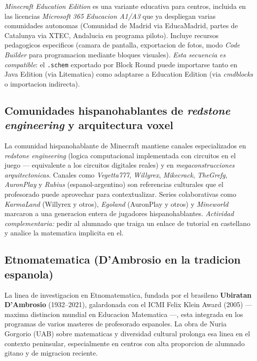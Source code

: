 \documentclass[12pt,a4paper]{scrartcl}
\newcommand{\acc}[1]{\textcolor{accent}{\textbf{#1}}}
\begin{document}
\emph{Minecraft Education Edition} es una variante educativa para centros, incluida en las licencias \emph{Microsoft 365 Educacion A1/A3} que ya despliegan varias comunidades autonomas (Comunidad de Madrid via EducaMadrid, partes de Catalunya via XTEC, Andalucia en programa piloto). Incluye recursos pedagogicos especificos (camara de pantalla, exportacion de fotos, modo \emph{Code Builder} para programacion mediante bloques visuales). \emph{Esta secuencia es compatible}: el \texttt{.schem} exportado por Block Round puede importarse tanto en Java Edition (via Litematica) como adaptarse a Education Edition (via \emph{cmdblocks} o importacion indirecta).

\subsection{Comunidades hispanohablantes de \emph{redstone engineering} y arquitectura voxel}

La comunidad hispanohablante de Minecraft mantiene canales especializados en \emph{redstone engineering} (logica computacional implementada con circuitos en el juego --- equivalente a los circuitos digitales reales) y en \emph{megaconstrucciones arquitectonicas}. Canales como \emph{Vegetta777}, \emph{Willyrex}, \emph{Mikecrack}, \emph{TheGrefg}, \emph{AuronPlay} y \emph{Rubius} (espanol-argentino) son referencias culturales que el profesorado puede aprovechar para contextualizar. Series colaborativas como \emph{KarmaLand} (Willyrex y otros), \emph{Egoland} (AuronPlay y otros) y \emph{Mineworld} marcaron a una generacion entera de jugadores hispanohablantes. \emph{Actividad complementaria:} pedir al alumnado que traiga un enlace de tutorial en castellano y analice la matematica implicita en el.

\subsection{Etnomatematica (D'Ambrosio en la tradicion espanola)}

La linea de investigacion en Etnomatematica, fundada por el brasileno \acc{Ubiratan D'Ambrosio} (1932--2021), galardonada con el ICMI Felix Klein Award (2005) --- maxima distincion mundial en Educacion Matematica ---, esta integrada en los programas de varios masteres de profesorado espanoles. La obra de Nuria Gorgorio (UAB) sobre matematicas y diversidad cultural prolonga esa linea en el contexto peninsular, especialmente en centros con alta proporcion de alumnado gitano y de migracion reciente.
\end{document}
